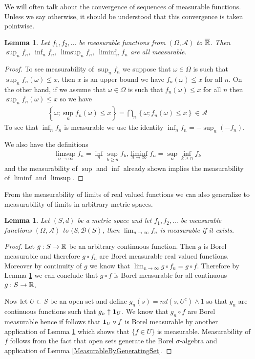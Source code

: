 \documentclass{amsart}
\newtheorem{lem}[thm]{Lemma}
\theoremstyle{remark}
\theoremstyle{definition}
\begin{document}
We will often talk about the
convergence of sequences of measurable functions.  Unless we say
otherwise, it should be understood that this convergence is taken pointwise.
\begin{lem}\label{LimitsOfMeasurable}Let $f_1, f_2, \dots$ be measurable functions from
  $(\Omega, \mathcal{A})$ to $\overline{\mathbb{R}}$.  Then $\sup_n f_n$,
  $\inf_n f_n$, $\limsup_n f_n$, $\liminf_n f_n$ are all measurable.
\end{lem}
\begin{proof}
To see measurability of $\sup_n f_n$ we suppose that $\omega \in
\Omega$ is such that $\sup_n f_n(\omega) \leq x$, then $x$ is an upper
bound we have $f_n(\omega) \leq x$ for all $n$.  On the other hand, if
we assume that $\omega \in \Omega$ is such that $f_n(\omega) \leq x$
for all $n$ then  $\sup_n f_n(\omega) \leq x$ so we have
\begin{align*}
\left \{\omega ; \sup_n f_n(\omega) \leq x \right \} = \bigcap_n \left
  \{\omega ; f_n(\omega) \leq x \right \} \in \mathcal{A}
\end{align*}
To see that $\inf_n f_n$ is measurable we use the identity $\inf_n f_n
= -\sup_n (-f_n)$.

We also have the definitions
\begin{align*}
\limsup_{n\to \infty} f_n = \inf_n \sup_{k \geq n} f_k \textrm{,} \liminf_{n\to \infty} f_n = \sup_n \inf_{k \geq n} f_k
\end{align*}
and the measurability of $\sup$ and $\inf$ already shown implies the
measurability of $\liminf$ and $\limsup$.
\end{proof}

From the measurability of limits of real valued functions we can also
generalize to measurability of limits in arbitrary metric spaces.
\begin{lem} \label{LimitsOfMeasurableMetricSpace}Let $(S,d)$ be a metric space and let
  $f_1, f_2, \dotsc$ be
  measurable functions  $(\Omega, \mathcal{A})$ to $(S,
  \mathcal{B}(S)$, then $\lim_{n \to \infty} f_n$ is measurable if it
  exists.
\end{lem}
\begin{proof}
Let $g : S \to \mathbb{R}$ be an arbitrary continuous function.  Then $g$
is Borel measurable and therefore $g \circ f_n$ are Borel measurable
real valued functions.  Moreover by continuity of $g$ we know that
$\lim_{n \to \infty} g \circ f_n  = g \circ f$.  Therefore by Lemma
\ref{LimitsOfMeasurable} we can conclude that $g \circ f$ is Borel
measurable for all continuous $g : S \to \mathbb{R}$.  

Now let $U \subset S$ be an open set and define $g_n(s) = n d(s,U^c)
\wedge 1$ so that $g_n$ are continuous functions such that $g_n
\uparrow \textbf{1}_{U}$.  We know that $g_n \circ f$ are Borel
measurable hence if follows that $\textbf{1}_{U} \circ f$ is Borel
measurable by another application of Lemma
\ref{LimitsOfMeasurable} which shows that $\lbrace f \in U \rbrace$ is
measurable.  Measurability of $f$ follows from the fact that open sets generate the Borel
$\sigma$-algebra and application of Lemma \ref{MeasurableByGeneratingSet}.
\end{proof}
\end{document}
